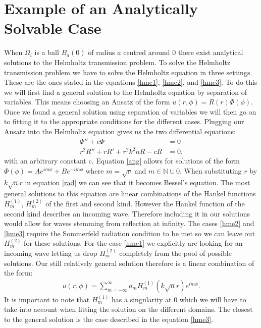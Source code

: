 \documentclass[a4paper, oneside]{thirdparty_stylesheets/discothesis}
\begin{document}
\section{Example of an Analytically Solvable Case} \label{sec:asc}
When $\Omega_i$ is a ball $B_a(0)$ of radius $a$ centred around $0$ there exist analytical solutions to the Helmholtz transmission problem. 
To solve the Helmholtz transmission problem we have to solve the Helmholtz equation in three settings. 
These are the ones stated in the equations \ref{hme1}, \ref{hme2}, and \ref{hme3}. 
To do this we will first find a general solution to the Helmholtz equation by separation of variables. 
This means choosing an Ansatz of the form $u(r,\phi)=R(r)\Phi(\phi)$.
Once we found a general solution using separation of variables we will then go on to fitting it to the appropriate conditions for the different cases.
Plugging our Ansatz into the Helmholtz equation gives us the two differential equations:
\begin{align}
	\Phi'' + c\Phi &= 0 \label{ang}\\
	r^2R'' + rR' + r^2k^2nR - cR &= 0 \label{rad}.
\end{align}
with an arbitrary constant c.
Equation \ref{ang} allows for solutions of the form $\Phi(\phi) = Ae^{im\phi} + Be^{-im\phi}$ where $m = \sqrt{c}$ and $m \in \mathbb{N} \cup {0}$. 
When substituting $r$ by $k\sqrt{n}r$ in equation \ref{rad} we can see that it becomes Bessel's equation.
The most general solutions to this equation are linear combinations of the Hankel functions $H_m^{(1)}$, $H_m^{(2)}$ of the first and second kind.
However the Hankel function of the second kind describes an incoming wave.
Therefore including it in our solutions would allow for waves stemming from reflection at infinity.
The cases \ref{hme2} and \ref{hme3} require the Sommerfeld radiation condition to be met so we can leave out $H_m^{(2)}$ for these solutions.
For the case \ref{hme1} we explicitly are looking for an incoming wave letting us drop $H_m^{(2)}$ completely from the pool of possible solutions.
Our still relatively general solution therefore is a linear combination of the form:
\begin{align}
	u(r,\phi) = \sum_{m=-\infty}^{\infty} a_m H_m^{(1)}(k\sqrt{n}r)e^{im\phi}.
\end{align}
It is important to note that $H_m^{(1)}$ has a singularity at $0$ which we will have to take into account when fitting the solution on the different domains.
The closest to the general solution is the case described in the equation \ref{hme3}.
\end{document}
